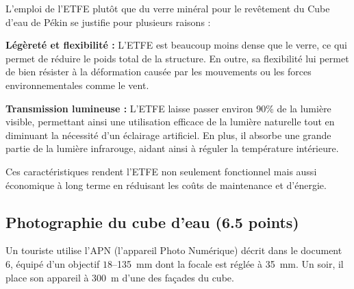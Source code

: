 \documentclass[answers]{exam}
\begin{document}
\begin{solution}
\begin{addmargin}[1em]{0em}
L'emploi de l'ETFE plutôt que du verre minéral pour le revêtement du Cube d'eau de Pékin se justifie pour plusieurs raisons :

\begin{compactitem}
    \item \textbf{Légèreté et flexibilité :} L'ETFE est beaucoup moins dense que le verre, ce qui permet de réduire le poids total de la structure. En outre, sa flexibilité lui permet de bien résister à la déformation causée par les mouvements ou les forces environnementales comme le vent.
    \item \textbf{Transmission lumineuse :} L'ETFE laisse passer environ 90\% de la lumière visible, permettant ainsi une utilisation efficace de la lumière naturelle tout en diminuant la nécessité d'un éclairage artificiel. En plus, il absorbe une grande partie de la lumière infrarouge, aidant ainsi à réguler la température intérieure.
\end{compactitem}

Ces caractéristiques rendent l'ETFE non seulement fonctionnel mais aussi économique à long terme en réduisant les coûts de maintenance et d'énergie.
\end{addmargin}
\end{solution}

\subsection*{Photographie du cube d'eau (6.5 points)}

Un touriste utilise l'APN (l'appareil Photo Numérique) décrit dans le document 6, équipé d'un objectif $18$–\SI{135}{mm} dont la focale est réglée à \SI{35}{mm}. Un soir, il place son appareil à \SI{300}{m} d'une des façades du cube.  
\end{document}
